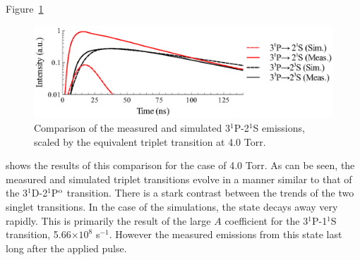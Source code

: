 Figure~\ref{fig:pstates}
\begin{figure}
  \centering
  \includegraphics{./chapters/emissions/figures/pstates.eps}
  \caption{Comparison of the measured and simulated 3$^1$P-2$^1$S emissions,
  scaled by the equivalent triplet transition at 4.0 Torr.}
  \label{fig:pstates}
\end{figure}
shows the results of this comparison for the case of 4.0 Torr. As can be seen,
the measured and simulated triplet transitions evolve in a manner similar to
that of the 3$^1$D-2$^1$P$^\mathrm{o}$ transition. There is a stark contrast between
the trends of the two singlet transitions. In the case of the simulations, the
state decays away very rapidly. This is primarily the result of the large $A$
coefficient for the 3$^1$P-1$^1$S transition, 5.66$\times10^{8}$ s$^{-1}$.
However the measured emissions from this state last long after the applied
pulse. 

